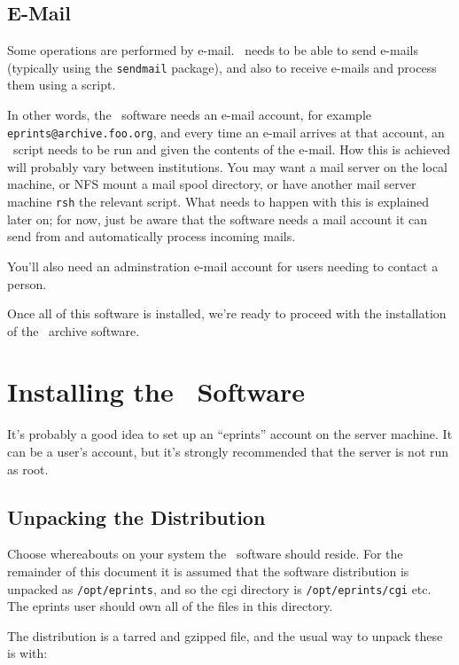 \subsection{E-Mail}

Some operations are performed by e-mail. \eprints\ needs to be able to send e-mails (typically using the {\tt sendmail} package), and also to receive e-mails and process them using a script.

In other words, the \eprints\ software needs an e-mail account, for example {\tt eprints@archive.foo.org}, and every time an e-mail arrives at that account, an \eprints\ script needs to be run and given the contents of the e-mail. How this is achieved will probably vary between institutions. You may want a mail server on the local machine, or NFS mount a mail spool directory, or have another mail server machine {\tt rsh} the relevant script. What needs to happen with this is explained later on; for now, just be aware that the software needs a mail account it can send from and automatically process incoming mails.

You'll also need an adminstration e-mail account for users needing to contact a person.

Once all of this software is installed, we're ready to proceed with the installation of the \eprints\ archive software.


\section{Installing the \eprints\ Software}
\label{install_software}

It's probably a good idea to set up an ``eprints'' account on the server machine. It can be a user's account, but it's strongly recommended that the server is not run as root.


\subsection{Unpacking the Distribution}

Choose whereabouts on your system the \eprints\ software should reside. For the remainder of this document it is assumed that the software distribution is unpacked as {\tt /opt/eprints}, and so the cgi directory is {\tt /opt/eprints/cgi} etc. The eprints user should own all of the files in this directory.

The distribution is a tarred and gzipped file, and the usual way to unpack these is with:

